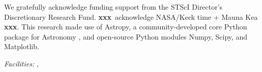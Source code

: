 \documentclass[iop, numberedappendix]{emulateapj}
\gdef\xxx{\textbf{xxx}}
\begin{document}
\noindent We gratefully acknowledge funding support from the STScI Director's Discretionary Research Fund.  \xxx\ acknowledge NASA/Keck time + Mauna Kea \xxx. This research made use of Astropy, a community-developed core Python package for Astronomy \citep{astropy}, and open-source Python modules Numpy, Scipy, and Matplotlib. 


{\it Facilities:} ,  %



\end{document}
